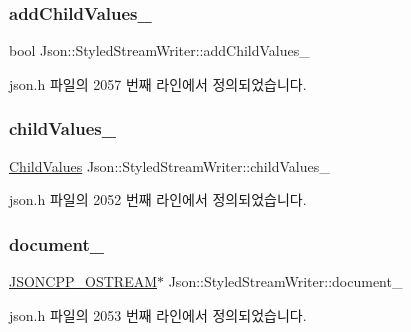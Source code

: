 \subsubsection{\texorpdfstring{add\+Child\+Values\+\_\+}{addChildValues\_}}
{\footnotesize\ttfamily bool Json\+::\+Styled\+Stream\+Writer\+::add\+Child\+Values\+\_\+\hspace{0.3cm}{\ttfamily [private]}}



json.\+h 파일의 2057 번째 라인에서 정의되었습니다.

\mbox{\label{class_json_1_1_styled_stream_writer_aafd62e00a401df73fcacb2e410114b3d}} 
\subsubsection{\texorpdfstring{child\+Values\+\_\+}{childValues\_}}
{\footnotesize\ttfamily \hyperlink{class_json_1_1_styled_stream_writer_a259bf9d99847b2ea64ec9c6dd441944e}{Child\+Values} Json\+::\+Styled\+Stream\+Writer\+::child\+Values\+\_\+\hspace{0.3cm}{\ttfamily [private]}}



json.\+h 파일의 2052 번째 라인에서 정의되었습니다.

\mbox{\label{class_json_1_1_styled_stream_writer_aa8c4e4576f5c3dcb10955d133a092dd6}} 
\subsubsection{\texorpdfstring{document\+\_\+}{document\_}}
{\footnotesize\ttfamily \hyperlink{json_8h_a37a25be5fca174927780caeb280094ce}{J\+S\+O\+N\+C\+P\+P\+\_\+\+O\+S\+T\+R\+E\+AM}$\ast$ Json\+::\+Styled\+Stream\+Writer\+::document\+\_\+\hspace{0.3cm}{\ttfamily [private]}}



json.\+h 파일의 2053 번째 라인에서 정의되었습니다.

